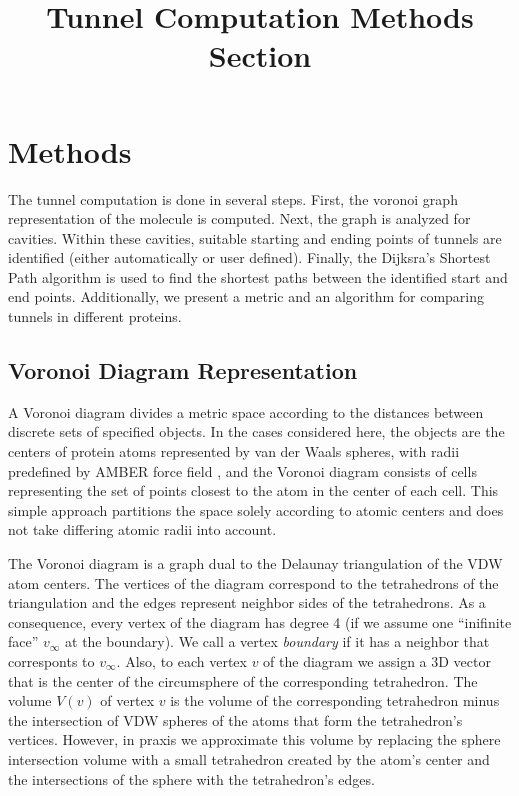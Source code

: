 \documentclass[11pt]{article} %
\title{Tunnel Computation Methods Section}
\author{}
\begin{document}
\maketitle

\section{Methods}

The tunnel computation is done in several steps. First, the voronoi graph representation of the molecule is computed. Next, the graph is analyzed for cavities. Within these cavities, suitable starting and ending points of tunnels are identified (either automatically or user defined). Finally, the Dijksra's Shortest Path algorithm is used to find the shortest paths between the identified start and end points. Additionally, we present a metric and an algorithm for comparing tunnels in different proteins.

\subsection{Voronoi Diagram Representation}
A Voronoi diagram divides a metric space according to the distances
between discrete sets of specified objects. In the cases considered
here, the objects are the centers of protein atoms represented by
van der Waals spheres, with radii predefined by AMBER force field
\cite{Cornell95}, and the Voronoi diagram consists of cells representing
the set of points closest to the atom in the center of each cell.
This simple approach partitions the space solely according to atomic centers
and does not take differing atomic radii into account. 

The Voronoi diagram is a graph dual to the Delaunay triangulation of the VDW atom
centers. The vertices of the diagram correspond to the tetrahedrons of the
triangulation and the edges represent neighbor sides of the tetrahedrons. As a consequence,
every vertex of the diagram has degree 4 (if we assume one ``inifinite face'' $v_{\infty}$ at the boundary).
We call a vertex \textit{boundary} if it has a neighbor that corresponts to $v_{\infty}$. Also, to each vertex $v$ of
the diagram we assign a 3D vector that is the center of the circumsphere of the corresponding tetrahedron.
The volume $V(v)$ of vertex $v$ is the volume of the corresponding tetrahedron minus the intersection of VDW
spheres of the atoms that form the tetrahedron's vertices. However, in praxis we approximate this volume
by replacing the sphere intersection volume with a small tetrahedron created by the atom's center and the intersections
of the sphere with the tetrahedron's edges.
\end{document}
